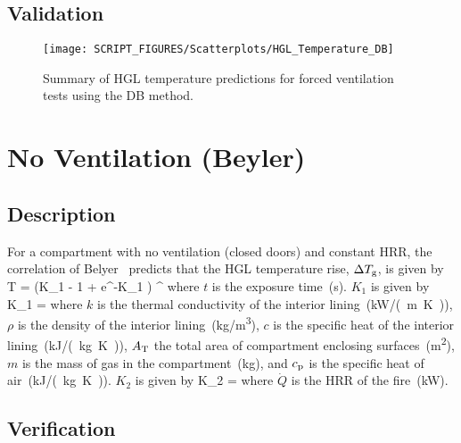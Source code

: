 \clearpage


\subsection*{Validation}

\begin{figure}[!ht]
\begin{center}
\texttt{[image: SCRIPT\_FIGURES/Scatterplots/HGL\_Temperature\_DB]}
\end{center}
\caption[Summary of HGL temperature predictions for forced ventilation tests (DB)]
{Summary of HGL temperature predictions for forced ventilation tests using the DB method.}
\label{HGL_Summary_Forced_Ventilation_DB}
\end{figure}


\clearpage


\section{No Ventilation (Beyler)}

\subsection*{Description}

For a compartment with no ventilation (closed doors) and constant HRR, the correlation of Belyer~\cite{SFPE:Walton} predicts that the HGL temperature rise, $\Delta T\sb{g}$, is given by
\be
\Delta T =  (K_1  - 1 + e^{-K_1 }) \quad ^
\label{eq:Beyler}
\ee
where $t$ is the exposure time~(\si{\second}). $K_1$ is given by
\be
K_1 = 
\label{eq:Beyler_K1}
\ee
where $k$ is the thermal conductivity of the interior lining~(\si{kW/(m.K)}), $\rho$ is the density of the interior lining~(\si{kg/m^3}), $c$ is the specific heat of the interior lining~(\si{kJ/(kg.K)}), $A\sb{T}$ the total area of compartment enclosing surfaces~(\si{m^2}), $m$ is the mass of gas in the compartment~(\si{kg}), and $c\sb{p}$ is the specific heat of air~(\si{kJ/(kg.K)}). $K_2$ is given by
\be
K_2 = 
\label{eq:Beyler_K2}
\ee
where $\dot Q$ is the HRR of the fire~(\si{kW}).


\clearpage


\subsection*{Verification}

